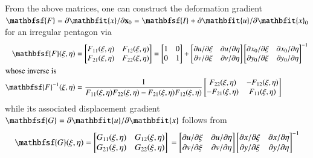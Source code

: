From the above matrices, one can construct the deformation gradient $\mathbfsf{F} = \partial \mathbfit{x} / \partial \mathbf{x}_0 = \mathbfsf{I} + \partial \mathbfit{u} / \partial \mathbfit{x}_0$ for an irregular pentagon via
\begin{subequations}
    \label{deformationGradient}
    \begin{align}
\mathbfsf{F} (\xi, \eta) & = 
\begin{bmatrix}
F_{11}(\xi, \eta) & F_{12}(\xi, \eta) \\
F_{21}(\xi, \eta) & F_{22}(\xi, \eta)
\end{bmatrix}  = 
\begin{bmatrix}
1 & 0 \\
0 & 1
\end{bmatrix} + 
\begin{bmatrix}
\partial u / \partial \xi & \partial u / \partial \eta \\
\partial v / \partial \xi & \partial v / \partial \eta
\end{bmatrix}
\begin{bmatrix}
\partial x_0 / \partial \xi & \partial x_0 / \partial \eta \\
\partial y_0 / \partial \xi & \partial y_0 / \partial \eta
\end{bmatrix}^{-1} \\
\intertext{whose inverse is}
\mathbfsf{F}^{-1} (\xi, \eta) & =
\frac{1}{F_{11} (\xi, \eta) F_{22} (\xi, \eta) - 
    F_{21} (\xi, \eta) F_{12} (\xi, \eta)}
\begin{bmatrix}
F_{22} (\xi, \eta) & -F_{12} (\xi, \eta) \\
-F_{21} (\xi, \eta) & F_{11} (\xi, \eta)
\end{bmatrix}
\end{align}
\end{subequations}
while its associated displacement gradient $\mathbfsf{G} = \partial \mathbfit{u} / \partial \mathbfit{x}$ follows from
\begin{equation}
\mathbfsf{G} (\xi, \eta) = 
\begin{bmatrix}
G_{11}(\xi, \eta) & G_{12}(\xi, \eta) \\
G_{21}(\xi, \eta) & G_{22}(\xi, \eta)
\end{bmatrix} 
\mbox{} = 
\begin{bmatrix}
\partial u / \partial \xi & \partial u / \partial \eta \\
\partial v / \partial \xi & \partial v / \partial \eta
\end{bmatrix}
\begin{bmatrix}
\partial x / \partial \xi & \partial x / \partial \eta \\
\partial y / \partial \xi & \partial y / \partial \eta
\end{bmatrix}^{-1} 
\label{displacementGradient}
\end{equation}
